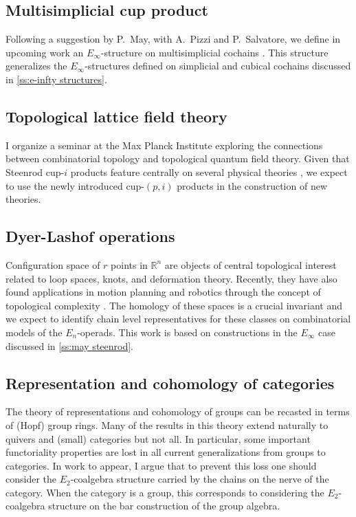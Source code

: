 \subsection{Multisimplicial cup product}

Following a suggestion by P.~May, with A.~Pizzi and P.~Salvatore, we define in upcoming work an $E_\infty$-structure on multisimplicial cochains \cite{medina2021multisimplicial}.
This structure generalizes the $E_\infty$-structures defined on simplicial and cubical cochains discussed in \cref{ss:e-infty structures}.

\subsection{Topological lattice field theory}

I organize a seminar at the Max Planck Institute exploring the connections between combinatorial topology and topological quantum field theory.
Given that Steenrod cup-$i$ products feature centrally on several physical theories \cite{gaiotto2016spin, bhardwaj2017fermionic, kapustin2017fermionic}, we expect to use the newly introduced cup-$(p,i)$ products in the construction of new theories.

\subsection{Dyer-Lashof operations}

Configuration space of $r$ points in $\mathbb R^n$ are objects of central topological interest related to loop spaces, knots, and deformation theory.
Recently, they have also found applications in motion planning and robotics through the concept of topological complexity \cite{farber2003motion.planning}.
The homology of these spaces is a crucial invariant and we expect to identify chain level representatives for these classes on combinatorial models of the $E_n$-operads.
This work is based on constructions in the $E_\infty$ case discussed in \cref{ss:may steenrod}.

\subsection{Representation and cohomology of categories}

The theory of representations and cohomology of groups can be recasted in terms of (Hopf) group rings.
Many of the results in this theory extend naturally to quivers and (small) categories but not all.
In particular, some important functoriality properties are lost in all current generalizations from groups to categories.
In work to appear, I argue that to prevent this loss one should consider the $E_2$-coalgebra structure carried by the chains on the nerve of the category.
When the category is a group, this corresponds to considering the $E_2$-coalgebra structure on the bar construction of the group algebra.

